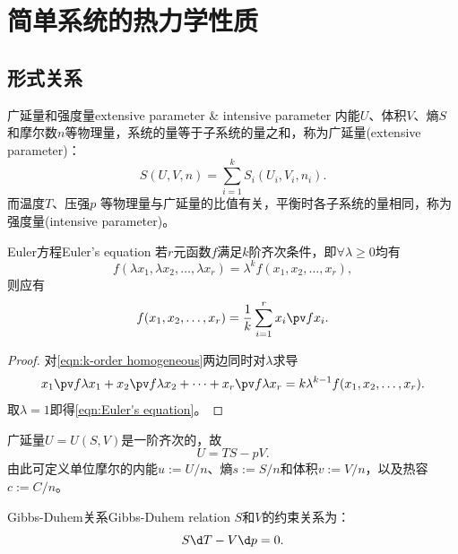 \chapter{简单系统的热力学性质}
\label{chap:simple system}

\section{形式关系}

\begin{definition}
	{广延量和强度量}{extensive parameter & intensive parameter}
	内能$U$、体积$V$、熵$S$和摩尔数$n$等物理量，系统的量等于子系统的量之和，称为广延量(extensive parameter)：
	\begin{equation}
		S(U,V,n)=\sum_{i=1}^kS_i(U_i,V_i,n_i).
	\end{equation}
	而温度$T$、压强$p$%
	等物理量与广延量的比值有关，平衡时各子系统的量相同，称为强度量(intensive parameter)。
\end{definition}

\begin{theorem}
	{Euler方程}{Euler's equation}
	若$r$元函数$f$满足$k$阶齐次条件，即$\forall\lambda\geq 0$均有
	\begin{equation}
		\label{eqn:k-order homogeneous}
		f(\lambda x_1,\lambda x_2,\ldots,\lambda x_r)=\lambda^k f(x_1,x_2,\ldots,x_r),
	\end{equation}
	则应有
	\begin{equation}
		\label{eqn:Euler's equation}
		f(x_1,x_2,\ldots,x_r)=\frac1k\sum_{i=1}^r x_i\pv f{x_i}.
	\end{equation}
\end{theorem}

\begin{proof}
	对\eqref{eqn:k-order homogeneous}两边同时对$\lambda$求导
	\[
		x_1\pv f{\lambda x_1}+x_2\pv f{\lambda x_2}+\cdots+x_r\pv f{\lambda x_r}=k\lambda^{k-1}f(x_1,x_2,\ldots,x_r).
	\]
	取$\lambda=1$即得\eqref{eqn:Euler's equation}。
\end{proof}

\begin{corollary}
	广延量$U=U(S,V)$是一阶齐次的，故
	\begin{equation}
		\label{eqn:U=TS-pV}
		U=TS-pV.
	\end{equation}
	由此可定义单位摩尔的内能$u:=U/n$、熵$s:=S/n$和体积$v:=V/n$，以及热容$c:=C/n$。
\end{corollary}

\begin{theorem}
	{Gibbs-Duhem关系}{Gibbs-Duhem relation}
	$S$和$V$的约束关系为：
	\begin{equation}
		S\d T-V\d p=0.
	\end{equation}
\end{theorem}

